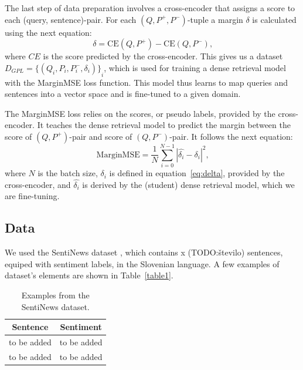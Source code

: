 \documentclass[fleqn,moreauthors,10pt]{ds_report}
\begin{document}
The last step of data preparation involves a cross-encoder that assigns a score to each (query, sentence)-pair. For each $(Q, P^{+}, P^{-})$-tuple a margin $\delta$ is calculated using the next equation:
\begin{equation}
	\delta = \text{CE}(Q, P^{+}) - \text{CE}(Q, P^{-})\text{,}
\label{eq:delta}
\end{equation}
where $CE$ is the score predicted by the cross-encoder. This gives us a dataset $D_{GPL} = {\{ ( Q_i, P_i, P_i^{-}, \delta_i ) \}}_i$, which is used for training a dense retrieval model with the MarginMSE loss function. This model thus learns to map queries and sentences into a vector space and is fine-tuned to a given domain.

The MarginMSE loss \cite{marginMSE} relies on the scores, or pseudo labels, provided by the cross-encoder. It teaches the dense retrieval model to predict the margin between the score of $(Q, P^{+})$-pair and score of $(Q, P^{-})$-pair. It follows the next equation:
\begin{equation}
	\text{MarginMSE} = \frac{1}{N} \sum_{i=0}^{N-1} |\hat{\delta_i} - \delta_i|^{2} \text{,}
\label{eq:delta}
\end{equation}
where $N$ is the batch size, $\delta_i$ is defined in equation~\ref{eq:delta}, provided by the cross-encoder, and $\hat{\delta_i}$ is derived by the (student) dense retrieval model, which we are fine-tuning.


\subsection*{Data}
We used the SentiNews dataset \cite{sentiNews}, which contains x (TODO:število) sentences, equiped with sentiment labels, in the Slovenian language. A few examples of dataset's elements are shown in Table~\ref{table1}.

\begin{table}
	\begin{center}
		\begin{tabular}{ |c|c| } 
		\hline
		Sentence & Sentiment \\
		\hline
		to be added & to be added\\
		to be added & to be added\\
		\hline
		\end{tabular}
	\end{center}
\caption{Examples from the SentiNews \cite{sentiNews} dataset.}
\label{tab1}
\end{table}
\end{document}
